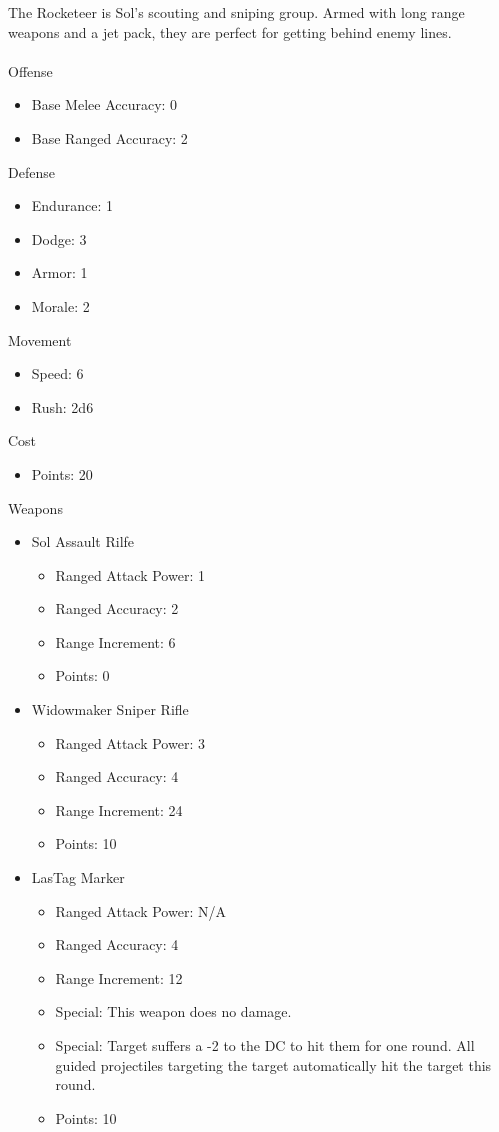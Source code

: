 \documentclass{article}
\begin{document}
The Rocketeer is Sol's scouting and sniping group.  Armed with long range weapons and a jet pack, they are perfect for getting behind enemy lines.\\
\\
Offense
\begin{itemize}
	\item Base Melee Accuracy: 0
	\item Base Ranged Accuracy: 2
\end{itemize}
Defense
\begin{itemize}
	\item Endurance: 1
	\item Dodge: 3
	\item Armor: 1
	\item Morale: 2
\end{itemize}
Movement
\begin{itemize}
	\item Speed: 6
	\item Rush: 2d6
\end{itemize}
Cost
\begin{itemize}
	\item Points: 20
\end{itemize}
Weapons
\begin{itemize}
	\item Sol Assault Rilfe
	\begin{itemize}
		\item Ranged Attack Power: 1
		\item Ranged Accuracy: 2
		\item Range Increment: 6
		\item Points: 0
	\end{itemize}
	\item Widowmaker Sniper Rifle
	\begin{itemize}
		\item Ranged Attack Power: 3
		\item Ranged Accuracy: 4
		\item Range Increment: 24
		\item Points: 10
	\end{itemize}
	\item LasTag Marker
	\begin{itemize}
		\item Ranged Attack Power: N/A
		\item Ranged Accuracy: 4
		\item Range Increment: 12
		\item Special: This weapon does no damage.
		\item Special: Target suffers a -2 to the DC to hit them for one round. All guided projectiles targeting the target automatically hit the target this round.
		\item Points: 10
	\end{itemize}
\end{itemize}
\end{document}
